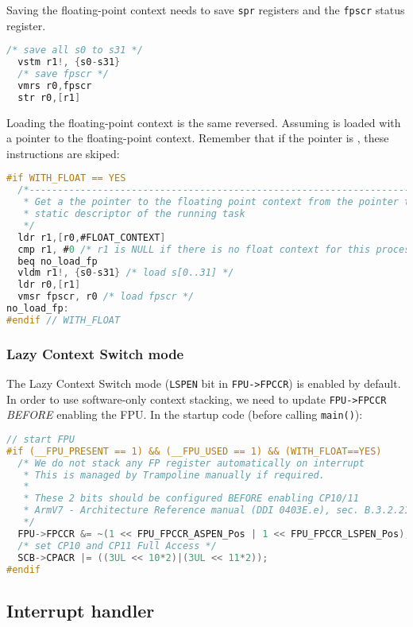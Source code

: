 Saving the floating-point context needs to save \texttt{spr} registers and the \texttt{fpscr} status register.

\begin{lstlisting}[language=C]
  /* save all s0 to s31 */
  vstm r1!, {s0-s31}
  /* save fpscr */
  vmrs r0,fpscr
  str r0,[r1]
\end{lstlisting}

Loading the floating-point context is the same reversed. Assuming  is loaded with a pointer to the floating-point context. Remember that if the pointer is , these instructions are skiped:

\begin{lstlisting}[language=C]
#if WITH_FLOAT == YES
  /*-------------------------------------------------------------------------
   * Get a the pointer to the floating point context from the pointer to the
   * static descriptor of the running task
   */
  ldr r1,[r0,#FLOAT_CONTEXT]
  cmp r1, #0 /* r1 is NULL if there is no float context for this process */
  beq no_load_fp
  vldm r1!, {s0-s31} /* load s[0..31] */
  ldr r0,[r1]
  vmsr fpscr, r0 /* load fpscr */
no_load_fp:
#endif // WITH_FLOAT
\end{lstlisting}

\subsubsection{Lazy Context Switch mode}
The Lazy Context Switch mode (\texttt{LSPEN} bit in \texttt{FPU->FPCCR}) is enabled by default. In order to use software-only context stacking, we need to update  \texttt{FPU->FPCCR} \emph{BEFORE} enabling the FPU. In the startup code (before calling \texttt{main()}):

\begin{lstlisting}[language=C]
// start FPU
#if (__FPU_PRESENT == 1) && (__FPU_USED == 1) && (WITH_FLOAT==YES)
  /* We do not stack any FP register automatically on interrupt    
   * This is managed by Trampoline manually if required.
   *
   * These 2 bits should be configured BEFORE enabling CP10/11
   * ArmV7 - Architecture Reference manual (DDI 0403E.e), sec. B.3.2.21
   */
  FPU->FPCCR &= ~(1 << FPU_FPCCR_ASPEN_Pos | 1 << FPU_FPCCR_LSPEN_Pos);
  /* set CP10 and CP11 Full Access */
  SCB->CPACR |= ((3UL << 10*2)|(3UL << 11*2));
#endif
\end{lstlisting}



\subsection{Interrupt handler}

